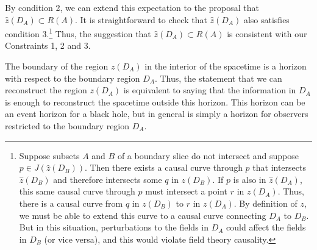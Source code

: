 \documentclass[12pt]{article}
\renewcommand{\(}{\left(}
\renewcommand{\)}{\right)}
\begin{document}
By condition 2, we can extend this expectation to the proposal that $\hat{z}(D_A) \subset R(A)$. It is straightforward to check that $\hat{z}(D_A)$ also satisfies condition 3.\footnote{Suppose subsets $A$ and $B$ of a boundary slice do not intersect and suppose $p \in J(\hat{z}(D_B))$. Then there exists a causal curve through $p$ that intersects $\hat{z}(D_B)$ and therefore intersects some $q$ in $z(D_B)$. If $p$ is also in $\hat{z}(D_A)$, this same causal curve through $p$ must intersect a point $r$ in $z(D_A)$. Thus, there is a causal curve from $q$ in $z(D_B)$ to $r$ in $z(D_A)$. By definition of $z$, we must be able to extend this curve to a causal curve connecting $D_A$ to $D_B$. But in this situation, perturbations to the fields in $D_A$ could affect the fields in $D_B$ (or vice versa), and this would violate field theory causality.} Thus, the suggestion that $\hat{z}(D_A) \subset R(A)$ is consistent with our Constraints 1, 2  and 3.

The boundary of the region $z(D_A)$ in the interior of the spacetime is a horizon with respect to the boundary region $D_A$. Thus, the statement that we can reconstruct the region $z(D_A)$ is equivalent to saying that the information in $D_A$ is enough to reconstruct the spacetime outside this horizon. This horizon can be an event horizon for a black hole, but in general is simply a horizon for observers restricted to the boundary region $D_A$.
\end{document}
